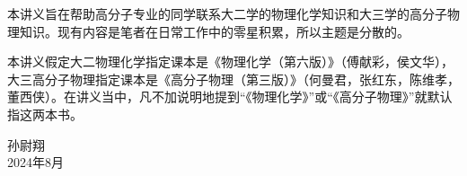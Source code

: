 \documentclass[main.tex]{subfiles}
\begin{document}
本讲义旨在帮助高分子专业的同学联系大二学的物理化学知识和大三学的高分子物理知识。现有内容是笔者在日常工作中的零星积累，所以主题是分散的。

本讲义假定大二物理化学指定课本是《物理化学（第六版）》（傅献彩，侯文华），大三高分子物理指定课本是《高分子物理（第三版）》（何曼君，张红东，陈维孝，董西侠）。在讲义当中，凡不加说明地提到“《物理化学》”或“《高分子物理》”就默认指这两本书。

\begin{flushright}
    孙尉翔\\
    2024年8月
\end{flushright}
\end{document}
